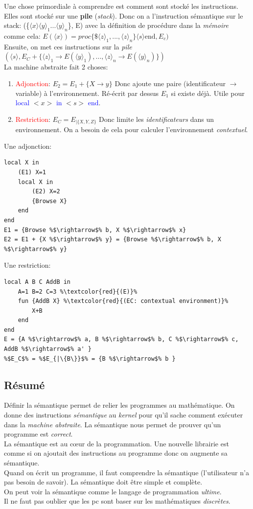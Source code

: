 \documentclass{report}
\begin{document}
Une chose primordiale à comprendre est comment sont stocké les instructions. Elles sont stocké sur une \textbf{pile} (\textit{stack}). Donc on a l'instruction sémantique sur le stack: (\{$\langle x \rangle \langle y \rangle_1 ... \langle y \rangle_n$\}, E) avec la définition de procédure dans la \textit{mémoire} comme cela: $E(\langle x \rangle) = proc\{\$ \langle z \rangle_1, ..., \langle z \rangle_n\} \langle s \rangle \text{end}, E_c)$ \\
Ensuite, on met ces instructions sur la \textit{pile} $(\langle s \rangle , E_C + \{\langle z \rangle_1 \rightarrow E(\langle y \rangle_1), ..., \langle z \rangle_n \rightarrow E(\langle y \rangle_n)\})$\\

La machine abstraite fait 2 choses:
\begin{enumerate}
\item \textcolor{red}{Adjonction}: $E_2 = E_1+\{X \rightarrow y\}$ Donc ajoute une paire (identificateur $\rightarrow$ variable) à l'environnement. Ré-écrit par dessus $E_1$ si existe déjà. Utile pour \textcolor{blue}{local} $<x>$ \textcolor{blue}{in} $<s>$ \textcolor{blue}{end}.
\item \textcolor{red}{Restriction}: $E_C = E_{|\{X,Y,Z\}}$ Donc limite les \textit{identificateurs} dans un environnement. On a besoin de cela pour calculer l'environnement \textit{contextuel}.
\end{enumerate}
Une adjonction:
\begin{lstlisting}[escapechar=\%]
local X in
	(E1) X=1 
	local X in 
		(E2) X=2 
		{Browse X}
	end 
end
E1 = {Browse %$\rightarrow$% b, X %$\rightarrow$% x}
E2 = E1 + {X %$\rightarrow$% y} = {Browse %$\rightarrow$% b, X %$\rightarrow$% y}
\end{lstlisting}
Une restriction:
\begin{lstlisting}[escapechar=\%]
local A B C AddB in
	A=1 B=2 C=3 %\textcolor{red}{(E)}%
	fun {AddB X} %\textcolor{red}{(EC: contextual environment)}%
		X+B
	end
end
E = {A %$\rightarrow$% a, B %$\rightarrow$% b, C %$\rightarrow$% c, AddB %$\rightarrow$% a' }
%$E_C$% = %$E_{|\{B\}}$% = {B %$\rightarrow$% b }
\end{lstlisting}
\subsection{Résumé}
Définir la sémantique permet de relier les programmes au mathématique. On donne des instructions \textit{sémantique} au \textit{kernel} pour qu'il sache comment exécuter dans la \textit{machine abstraite}. La sémantique nous permet de prouver qu'un programme est \textit{correct}.\\
La sémantique est au cœur de la programmation. Une nouvelle librairie est comme si on ajoutait des instructions au programme donc on augmente sa sémantique.\\
Quand on écrit un programme, il faut comprendre la sémantique (l'utilisateur n'a pas besoin de savoir). La sémantique doit être simple et complète.\\
On peut voir la sémantique comme le langage de programmation \textit{ultime}.\\
Il ne faut pas oublier que les pc sont baser sur les mathématiques \textit{discrètes}.
\end{document}
